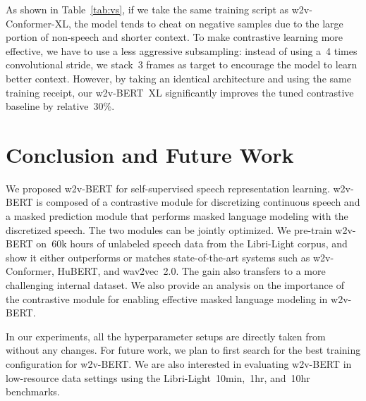 \documentclass{article}
\begin{document}
\begin{table}[htbp]
  \caption{Results on voice search data. Baseline conformer model is 100M parameters. All the other models are 600M parameters, marked as XL.}
  \vskip 0.1in
  \label{tab:vs}
  \centering
\end{table}

As shown in Table~\ref{tab:vs}, if we take the same training script as w2v-Conformer-XL, the model tends to cheat on negative samples due to the large portion of non-speech and shorter context.
To make contrastive learning more effective, we have to use a less aggressive subsampling: instead of using a~4 times convolutional stride, we stack~3 frames as target to encourage the model to learn better context.
However, by taking an identical architecture and using the same training receipt, our w2v-BERT~XL significantly improves the tuned contrastive baseline by relative~30\%.


\section{Conclusion and Future Work}
\label{sec:conclusion}
We proposed w2v-BERT for self-supervised speech representation learning.
w2v-BERT is composed of a contrastive module for discretizing continuous speech and a masked prediction module that performs masked language modeling with the discretized speech.
The two modules can be jointly optimized.
We pre-train w2v-BERT on~60k hours of unlabeled speech data from the Libri-Light corpus, and show it either outperforms or matches state-of-the-art systems such as w2v-Conformer, HuBERT, and wav2vec~2.0.
The gain also transfers to a more challenging internal dataset.
We also provide an analysis on the importance of the contrastive module for enabling effective masked language modeling in w2v-BERT.

In our experiments, all the hyperparameter setups are directly taken from~\cite{zhang2020pushing} without any changes.
For future work, we plan to first search for the best training configuration for w2v-BERT.
We are also interested in evaluating w2v-BERT in low-resource data settings using the Libri-Light~10min,~1hr, and~10hr benchmarks.








\end{document}
